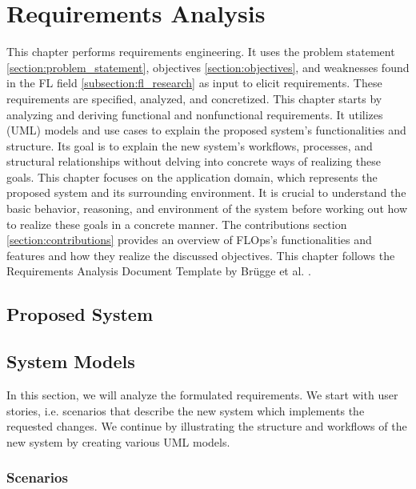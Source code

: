 \chapter{Requirements Analysis}

This chapter performs requirements engineering.
It uses the problem statement \ref{section:problem_statement}, objectives \ref{section:objectives}, and weaknesses found in the FL field \ref{subsection:fl_research} as input to elicit requirements.
These requirements are specified, analyzed, and concretized. 
This chapter starts by analyzing and deriving functional and nonfunctional requirements.
It utilizes (UML) models and use cases to explain the proposed system's functionalities and structure.
Its goal is to explain the new system's workflows, processes, and structural relationships without delving into concrete ways of realizing these goals.
This chapter focuses on the application domain, which represents the proposed system and its surrounding environment.
It is crucial to understand the basic behavior, reasoning, and environment of the system before working out how to realize these goals in a concrete manner.
The contributions section \ref{section:contributions} provides an overview of FLOps's functionalities and features and how they realize the discussed objectives.
This chapter follows the Requirements Analysis Document Template by Brügge et al. \cite{book:bruegge}.



\section{Proposed System}





\section{System Models}

In this section, we will analyze the formulated requirements. We start with user stories, i.e. scenarios that describe the new system which implements the requested changes.
We continue by illustrating the structure and workflows of the new system by creating various UML models.

\subsection{Scenarios}

